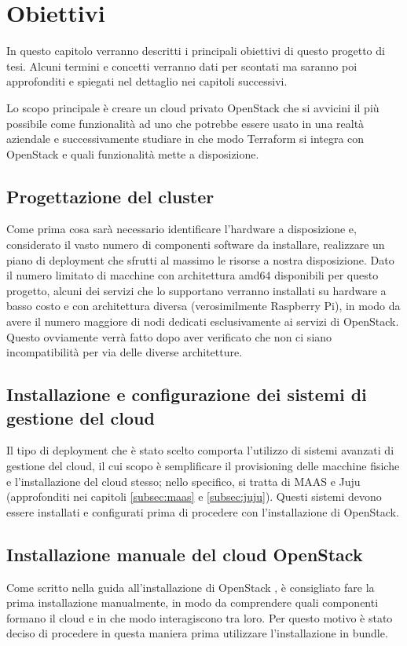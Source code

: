 \chapter{Obiettivi}

In questo capitolo verranno descritti i principali obiettivi di questo progetto di tesi. Alcuni termini e concetti verranno dati per scontati ma saranno poi approfonditi e spiegati nel dettaglio nei capitoli successivi.

Lo scopo principale è creare un cloud privato OpenStack che si avvicini il più possibile come funzionalità ad uno che potrebbe essere usato in una realtà aziendale e successivamente studiare in che modo Terraform si integra con OpenStack e quali funzionalità mette a disposizione.

\section{Progettazione del cluster}
Come prima cosa sarà necessario identificare l'hardware a disposizione e, considerato il vasto numero di componenti software da installare, realizzare un piano di deployment che sfrutti al massimo le risorse a nostra disposizione. Dato il numero limitato di macchine con architettura amd64 disponibili per questo progetto, alcuni dei servizi che lo supportano verranno installati su hardware a basso costo e con architettura diversa (verosimilmente Raspberry Pi), in modo da avere il numero maggiore di nodi dedicati esclusivamente ai servizi di OpenStack. Questo ovviamente verrà fatto dopo aver verificato che non ci siano incompatibilità per via delle diverse architetture.

\section{Installazione e configurazione dei sistemi di gestione del cloud}
Il tipo di deployment che è stato scelto comporta l'utilizzo di sistemi avanzati di gestione del cloud, il cui scopo è semplificare il provisioning delle macchine fisiche e l'installazione del cloud stesso; nello specifico, si tratta di MAAS e Juju (approfonditi nei capitoli \ref{subsec:maas} e \ref{subsec:juju}). Questi sistemi devono essere installati e configurati prima di procedere con l'installazione di OpenStack.

\section{Installazione manuale del cloud OpenStack}
Come scritto nella guida all'installazione di OpenStack \cite{openstack_installation_juju}, è consigliato fare la prima installazione manualmente, in modo da comprendere quali componenti formano il cloud e in che modo interagiscono tra loro. Per questo motivo è stato deciso di procedere in questa maniera prima utilizzare l'installazione in bundle.

